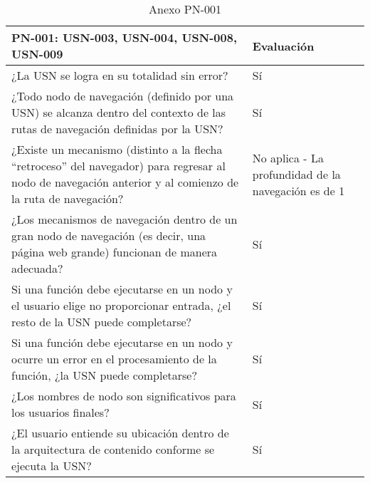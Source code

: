 \begin{table}[htpb]
\centering
\begin{tabularx}{\textwidth}{|X|X|}
\hline
\textbf{PN-001: USN-003, USN-004, USN-008, USN-009}                                                                                                         & \textbf{Evaluación}                                 \\ \hline
¿La USN se logra en su totalidad sin error?                                                                                                                & Sí                                                  \\ \hline
¿Todo nodo de navegación (definido por una USN) se alcanza dentro del contexto de las rutas de navegación definidas por la USN?                            & Sí                                                  \\ \hline
¿Existe un mecanismo (distinto a la flecha ``retroceso'' del navegador) para regresar al nodo de navegación anterior y al comienzo de la ruta de navegación? & No aplica - La profundidad de la navegación es de 1 \\ \hline
¿Los mecanismos de navegación dentro de un gran nodo de navegación (es decir, una página web grande) funcionan de manera adecuada?                         & Sí                                                  \\ \hline
Si una función debe ejecutarse en un nodo y el usuario elige no proporcionar entrada, ¿el resto de la USN puede completarse?                               & Sí                                                  \\ \hline
Si una función debe ejecutarse en un nodo y ocurre un error en el procesamiento de la función, ¿la USN puede completarse?                                  & Sí                                                  \\ \hline
¿Los nombres de nodo son significativos para los usuarios finales?                                                                                         & Sí                                                  \\ \hline
¿El usuario entiende su ubicación dentro de la arquitectura de contenido conforme se ejecuta la USN?                                                       & Sí                                                  \\ \hline
\end{tabularx}
\caption{Anexo PN-001}
\end{table}


